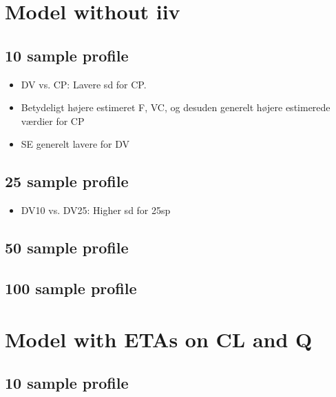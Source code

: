 \section{Model without iiv}
\subsection{10 sample profile}




\begin{itemize}
    \item DV vs. CP: Lavere sd for CP. 
    \item Betydeligt højere estimeret F, VC, og desuden generelt højere estimerede værdier for CP
    \item SE generelt lavere for DV
\end{itemize}

\subsection{25 sample profile}

\begin{itemize}
    \item DV10 vs. DV25: Higher sd for 25sp
\end{itemize}




\subsection{50 sample profile}





\subsection{100 sample profile}





\section{Model with ETAs on CL and Q}
\subsection{10 sample profile}
